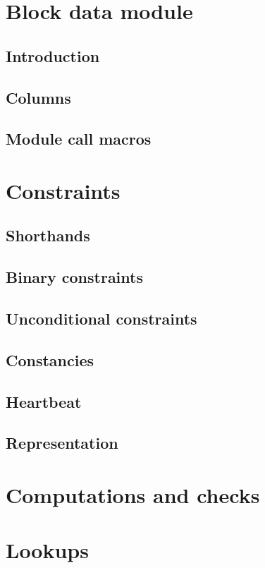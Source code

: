 

\section{Block data module}
\subsection{Introduction}                \label{block data: intro}                     
\subsection{Columns}                     \label{block data: columns}                   
\subsection{Module call macros}          \label{block data: module calls}              

\section{Constraints}
\subsection{Shorthands}                  \label{block data: shorthands}                
\subsection{Binary constraints}          \label{block data: binarities}                
\subsection{Unconditional constraints}   \label{block data: unconditional}             
\subsection{Constancies}                 \label{block data: constancies}               
\subsection{Heartbeat}                   \label{block data: heartbeat}                 
\subsection{Representation}              \label{block data: representation}            

\section{Computations and checks}        \label{block data: computations and checks}   

\section{Lookups}                        \label{block data: lookups}                   
